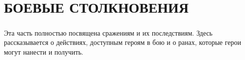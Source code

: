 \chapter{БОЕВЫЕ СТОЛКНОВЕНИЯ}
\paragraph{}
Эта часть полностью посвящена сражениям и их последствиям.
Здесь рассказывается о действиях, доступным героям в бою
и о ранах, которые герои могут нанести и получить.






